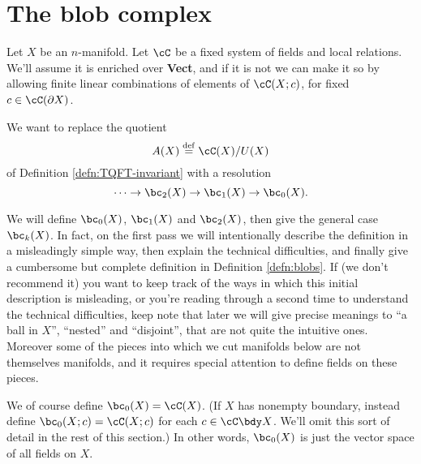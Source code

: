 
\section{The blob complex}
\label{sec:blob-definition}

Let $X$ be an $n$-manifold.
Let $\cC$ be a fixed system of fields and local relations.
We'll assume it is enriched over \textbf{Vect}, and if it is not we can make it so by allowing finite
linear combinations of elements of $\cC(X; c)$, for fixed $c\in \cC(\bd X)$.


We want to replace the quotient
\[
	A(X) \deq \lf(X) / U(X)
\]
of Definition \ref{defn:TQFT-invariant} with a resolution
\[
	\cdots \to \bc_2(X) \to \bc_1(X) \to \bc_0(X) .
\]

We will define $\bc_0(X)$, $\bc_1(X)$ and $\bc_2(X)$, then give the general case $\bc_k(X)$. 
In fact, on the first pass we will intentionally describe the definition in a misleadingly simple way, then explain the technical difficulties, and finally give a cumbersome but complete definition in Definition \ref{defn:blobs}. If (we don't recommend it) you want to keep track of the ways in which this initial description is misleading, or you're reading through a second time to understand the technical difficulties, keep note that later we will give precise meanings to ``a ball in $X$'', ``nested'' and ``disjoint'', that are not quite the intuitive ones. Moreover some of the pieces into which we cut manifolds below are not themselves manifolds, and it requires special attention to define fields on these pieces.

We of course define $\bc_0(X) = \lf(X)$.
(If $X$ has nonempty boundary, instead define $\bc_0(X; c) = \lf(X; c)$ for each $c \in \lf{\bdy X}$.
We'll omit this sort of detail in the rest of this section.)
In other words, $\bc_0(X)$ is just the vector space of all fields on $X$.

